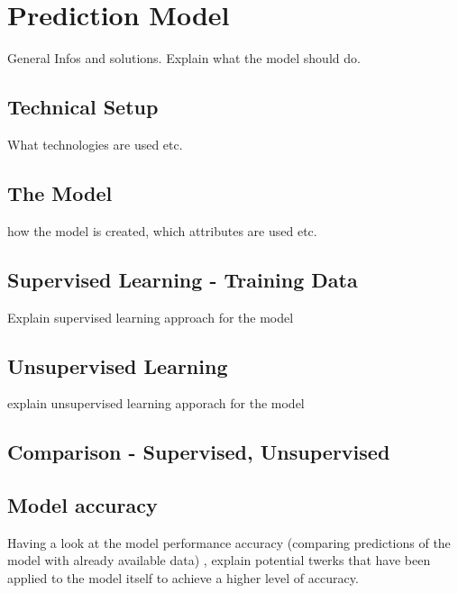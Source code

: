 %
%
% 
% 
% 

\chapter{Prediction Model}
\label{chap:prediction_model}
General Infos and solutions. Explain what the model should do.

\section{Technical Setup}
What technologies are used etc. 

\section{The Model}
how the model is created, which attributes are used etc. 

\section{Supervised Learning - Training Data}
Explain supervised learning approach for the model

\section{Unsupervised Learning}
explain unsupervised learning apporach for the model

\section{Comparison - Supervised, Unsupervised}

\section{Model accuracy}
Having a look at the model performance accuracy (comparing predictions of the model with already available data) , explain potential twerks that have been applied to the model itself to achieve a higher level of accuracy.

